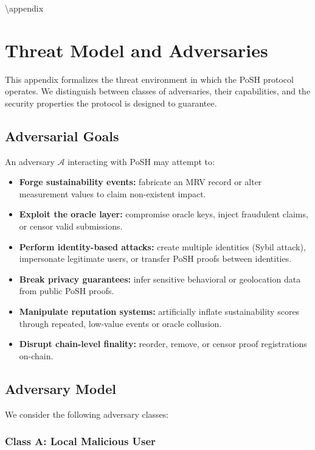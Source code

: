 \documentclass{article}
\begin{document}

{\textbackslash}appendix

\section{Threat Model and Adversaries}

This appendix formalizes the threat environment in which the PoSH protocol
operates. We distinguish between classes of adversaries, their capabilities,
and the security properties the protocol is designed to guarantee.

\subsection{Adversarial Goals}

An adversary $\mathcal{A}$ interacting with PoSH may attempt to:

\begin{itemize}
\item \textbf{Forge sustainability events:} fabricate an MRV record or alter
measurement values to claim non-existent impact.
\item \textbf{Exploit the oracle layer:} compromise oracle keys, inject
fraudulent claims, or censor valid submissions.
\item \textbf{Perform identity-based attacks:} create multiple identities
(Sybil attack), impersonate legitimate users, or transfer PoSH proofs
between identities.
\item \textbf{Break privacy guarantees:} infer sensitive behavioral or
geolocation data from public PoSH proofs.
\item \textbf{Manipulate reputation systems:} artificially inflate sustainability
scores through repeated, low-value events or oracle collusion.
\item \textbf{Disrupt chain-level finality:} reorder, remove, or censor proof
registrations on-chain.
\end{itemize}

\subsection{Adversary Model}

We consider the following adversary classes:

\subsubsection{Class A: Local Malicious User}
\end{document}
